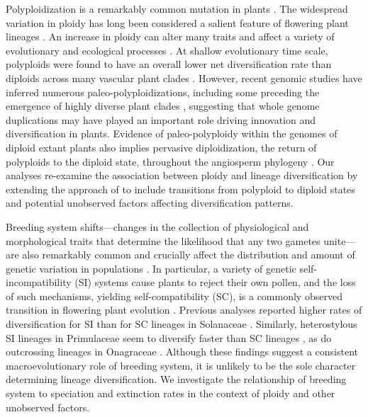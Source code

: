 Polyploidization is a remarkably common mutation in plants \citep{husband_2013, zenilferguson_2017}.
The widespread variation in ploidy has long been considered a salient feature of flowering plant lineages \citep{stebbins1938}. 
An increase in ploidy can alter many traits and affect a variety of evolutionary and ecological processes \citep{ramsey_2002, sessa_2019}.
At shallow evolutionary time scale, polyploids were found to have an overall lower net diversification rate than diploids across many vascular plant clades \citep{mayrose_2011, mayrose_2015}. %
However, recent genomic studies have inferred numerous paleo-polyploidizations, including some preceding the emergence of highly diverse plant clades \citep{soltis_2014, landis_2018}, suggesting that whole genome duplications may have played an important  role driving innovation and diversification in plants. 
Evidence of paleo-polyploidy within the genomes of diploid extant plants also implies pervasive diploidization, the return of polyploids to the diploid state, throughout the angiosperm phylogeny \citep{soltis_2015, dodsworth_2015}.
Our analyses re-examine the association between ploidy and lineage diversification by extending the approach of \citet{mayrose_2011, mayrose_2015} to include transitions from polyploid to diploid states and potential unobserved factors affecting diversification patterns.

Breeding system shifts---changes in the collection of physiological and morphological traits that determine the likelihood that any two gametes unite---are also remarkably common and crucially affect the distribution and amount of genetic variation in populations \citep{barrett2013}. 
In particular, a variety of genetic self-incompatibility (SI) systems cause plants to reject their own pollen, and the loss of such mechanisms, yielding self-compatibility (SC), is a commonly observed transition in flowering plant evolution \citep{stebbins1974, igic_2008}.
Previous analyses reported higher rates of diversification for SI than for SC lineages in Solanaceae \citep{goldberg_2010}. 
Similarly, heterostylous SI lineages in Primulaceae seem to diversify faster than SC lineages \citep{devos2014}, as do outcrossing lineages in Onagraceae \citep{freyman_2019}.
Although these findings suggest a consistent macroevolutionary role of breeding system, it is unlikely to be the sole character determining lineage diversification.
We investigate the relationship of breeding system to speciation and extinction rates in the context of ploidy and other unobserved factors.

